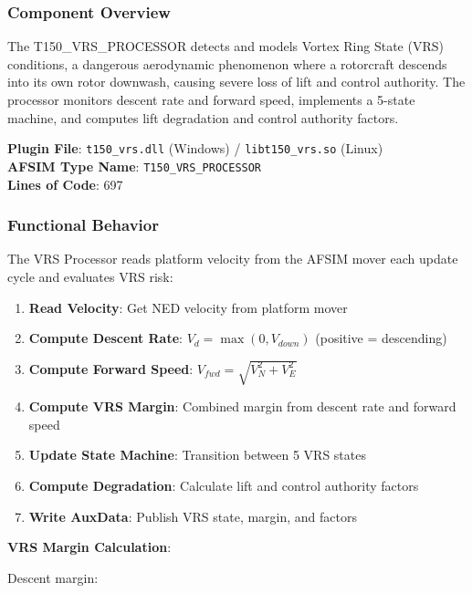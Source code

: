 \subsubsection{\unclass Component Overview}\label{sec:VRSOverview}

\unclass The T150\_VRS\_PROCESSOR detects and models Vortex Ring State (VRS) conditions, a dangerous aerodynamic phenomenon where a rotorcraft descends into its own rotor downwash, causing severe loss of lift and control authority. The processor monitors descent rate and forward speed, implements a 5-state machine, and computes lift degradation and control authority factors.

\unclass \textbf{Plugin File}: \texttt{t150\_vrs.dll} (Windows) / \texttt{libt150\_vrs.so} (Linux)\\
\textbf{AFSIM Type Name}: \texttt{T150\_VRS\_PROCESSOR}\\
\textbf{Lines of Code}: 697

\subsubsection{\unclass Functional Behavior}\label{sec:VRSFunctionalBehavior}

\unclass The VRS Processor reads platform velocity from the AFSIM mover each update cycle and evaluates VRS risk:

\begin{enumerate}
	\item \unclass \textbf{Read Velocity}: Get NED velocity from platform mover
	\item \unclass \textbf{Compute Descent Rate}: $V_d = \max(0, V_{down})$ (positive = descending)
	\item \unclass \textbf{Compute Forward Speed}: $V_{fwd} = \sqrt{V_N^2 + V_E^2}$
	\item \unclass \textbf{Compute VRS Margin}: Combined margin from descent rate and forward speed
	\item \unclass \textbf{Update State Machine}: Transition between 5 VRS states
	\item \unclass \textbf{Compute Degradation}: Calculate lift and control authority factors
	\item \unclass \textbf{Write AuxData}: Publish VRS state, margin, and factors
\end{enumerate}

\unclass \textbf{VRS Margin Calculation}:

\unclass Descent margin:

